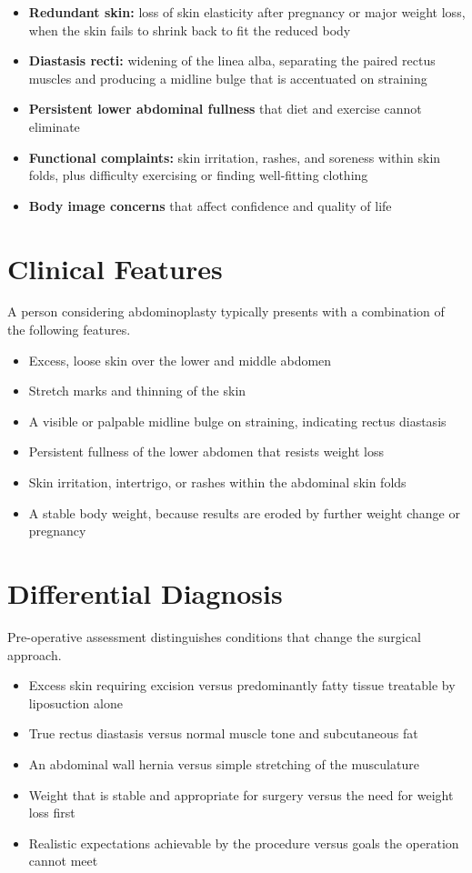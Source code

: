 \begin{itemize}
    \item \textbf{Redundant skin:} loss of skin elasticity after pregnancy or major weight loss, when the skin fails to shrink back to fit the reduced body
    \item \textbf{Diastasis recti:} widening of the linea alba, separating the paired rectus muscles and producing a midline bulge that is accentuated on straining
    \item \textbf{Persistent lower abdominal fullness} that diet and exercise cannot eliminate
    \item \textbf{Functional complaints:} skin irritation, rashes, and soreness within skin folds, plus difficulty exercising or finding well-fitting clothing
    \item \textbf{Body image concerns} that affect confidence and quality of life
\end{itemize}

\section*{Clinical Features}
A person considering abdominoplasty typically presents with a combination of the following features.

\begin{itemize}
    \item Excess, loose skin over the lower and middle abdomen
    \item Stretch marks and thinning of the skin
    \item A visible or palpable midline bulge on straining, indicating rectus diastasis
    \item Persistent fullness of the lower abdomen that resists weight loss
    \item Skin irritation, intertrigo, or rashes within the abdominal skin folds
    \item A stable body weight, because results are eroded by further weight change or pregnancy
\end{itemize}

\section*{Differential Diagnosis}
Pre-operative assessment distinguishes conditions that change the surgical approach.

\begin{itemize}
    \item Excess skin requiring excision versus predominantly fatty tissue treatable by liposuction alone
    \item True rectus diastasis versus normal muscle tone and subcutaneous fat
    \item An abdominal wall hernia versus simple stretching of the musculature
    \item Weight that is stable and appropriate for surgery versus the need for weight loss first
    \item Realistic expectations achievable by the procedure versus goals the operation cannot meet
\end{itemize}

